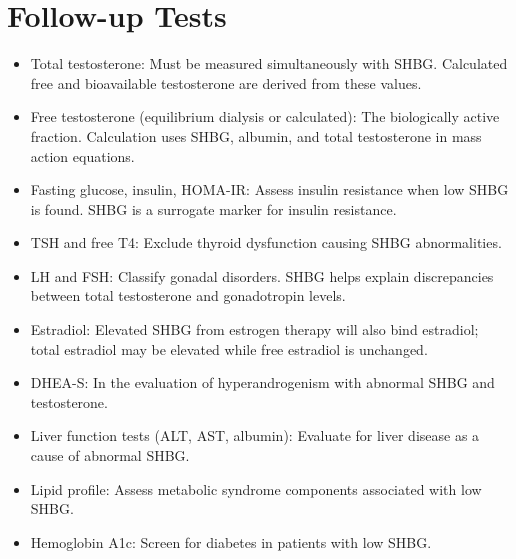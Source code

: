 \section*{Follow-up Tests}
\begin{itemize}
  \item Total testosterone: Must be measured simultaneously with SHBG. Calculated free and bioavailable testosterone are derived from these values.
  \item Free testosterone (equilibrium dialysis or calculated): The biologically active fraction. Calculation uses SHBG, albumin, and total testosterone in mass action equations.
  \item Fasting glucose, insulin, HOMA-IR: Assess insulin resistance when low SHBG is found. SHBG is a surrogate marker for insulin resistance.
  \item TSH and free T4: Exclude thyroid dysfunction causing SHBG abnormalities.
  \item LH and FSH: Classify gonadal disorders. SHBG helps explain discrepancies between total testosterone and gonadotropin levels.
  \item Estradiol: Elevated SHBG from estrogen therapy will also bind estradiol; total estradiol may be elevated while free estradiol is unchanged.
  \item DHEA-S: In the evaluation of hyperandrogenism with abnormal SHBG and testosterone.
  \item Liver function tests (ALT, AST, albumin): Evaluate for liver disease as a cause of abnormal SHBG.
  \item Lipid profile: Assess metabolic syndrome components associated with low SHBG.
  \item Hemoglobin A1c: Screen for diabetes in patients with low SHBG.
\end{itemize}

